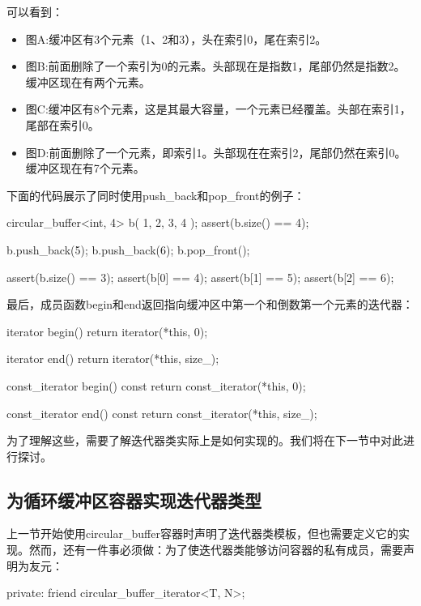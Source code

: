 可以看到：

\begin{itemize}
  \item 图A:缓冲区有3个元素（1、2和3），头在索引0，尾在索引2。
  \item 图B:前面删除了一个索引为0的元素。头部现在是指数1，尾部仍然是指数2。缓冲区现在有两个元素。
  \item 图C:缓冲区有8个元素，这是其最大容量，一个元素已经覆盖。头部在索引1，尾部在索引0。
  \item 图D:前面删除了一个元素，即索引1。头部现在在索引2，尾部仍然在索引0。缓冲区现在有7个元素。
\end{itemize}

下面的代码展示了同时使用push_back和pop_front的例子：

\begin{cppcode}
circular_buffer<int, 4> b({ 1, 2, 3, 4 });
assert(b.size() == 4);

b.push_back(5);
b.push_back(6);
b.pop_front();

assert(b.size() == 3);
assert(b[0] == 4);
assert(b[1] == 5);
assert(b[2] == 6);
\end{cppcode}

最后，成员函数begin和end返回指向缓冲区中第一个和倒数第一个元素的迭代器：

\begin{cppcode}
iterator begin()
{
	return iterator(*this, 0);
}

iterator end()
{
	return iterator(*this, size_);
}

const_iterator begin() const
{
	return const_iterator(*this, 0);
}

const_iterator end() const
{
	return const_iterator(*this, size_);
}
\end{cppcode}

为了理解这些，需要了解迭代器类实际上是如何实现的。我们将在下一节中对此进行探讨。

\subsection{为循环缓冲区容器实现迭代器类型}

上一节开始使用circular_buffer容器时声明了迭代器类模板，但也需要定义它的实现。然而，还有一件事必须做：为了使迭代器类能够访问容器的私有成员，需要声明为友元：

\begin{cppcode}
private:
	friend circular_buffer_iterator<T, N>;
\end{cppcode}


